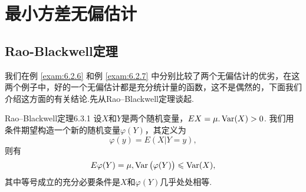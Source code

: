 \section{最小方差无偏估计\label{sec:6.3}}
\subsection{Rao-Blackwell定理\label{ssec:6.3.1}}
我们在例 \ref{exam:6.2.6} 和例 \ref{exam:6.2.7} 中分别比较了两个无偏估计的优劣，在这两个例子中，好的一个无偏估计都是充分统计量的函数，这不是偶然的，下面我们介绍这方面的有关结论.先从Rao--Blackwell定理谈起.

\begin{theorem}{Rao--Blackwell定理}{6.3.1}
  设$X$和$Y$是两个随机变量，$EX=\mu.\operatorname{Var}(X)>0$. 我们用条件期望构造一个新的随机变量$\varphi(Y)$，其定义为
  \[
    \varphi(y) = E(X|Y=y),
  \]
  则有
  \[
     E\varphi(Y) = \mu,\operatorname{Var}\big(\varphi(Y)\big) \leqslant \operatorname{Var}(X),
  \]
  其中等号成立的充分必要条件是$X$和$\varphi(Y)$几乎处处相等.
\end{theorem}

